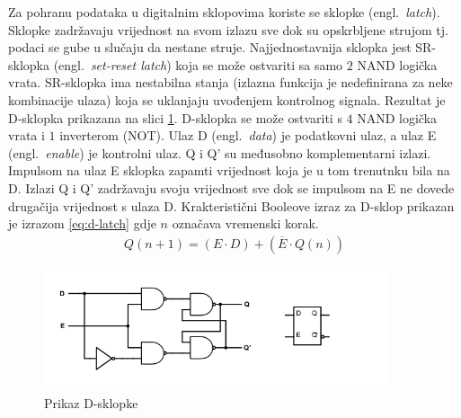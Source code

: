 \documentclass[times, utf8, diplomski]{fer}
\begin{document}
Za pohranu podataka u digitalnim sklopovima koriste se sklopke (engl.~\textit{latch}). Sklopke zadržavaju vrijednost na svom izlazu sve dok su opskrbljene strujom tj. podaci se gube u slučaju da nestane struje. Najjednostavnija sklopka jest SR-sklopka (engl.~\textit{set-reset latch}) koja se može ostvariti sa samo $2$ NAND logička vrata. SR-sklopka ima nestabilna stanja (izlazna funkcija je nedefinirana za neke kombinacije ulaza) koja se uklanjaju uvođenjem kontrolnog signala. Rezultat je D-sklopka prikazana na slici \ref{fig:D-latch}. D-sklopka se može ostvariti s $4$ NAND logička vrata i $1$ inverterom (NOT). Ulaz D (engl.~\textit{data}) je podatkovni ulaz, a ulaz E (engl.~\textit{enable}) je kontrolni ulaz. Q i Q' su međusobno komplementarni izlazi. Impulsom na ulaz E sklopka zapamti vrijednost koja je u tom trenutnku bila na D. Izlazi Q i Q' zadržavaju svoju vrijednost sve dok se impulsom na E ne dovede drugačija vrijednost s ulaza D. Krakteristični Booleove izraz za D-sklop prikazan je izrazom \ref{eq:d-latch} gdje $n$ označava vremenski korak.
%
\begin{gather}
	\label{eq:d-latch}
	Q(n+1)=(E \cdot D) + (\overline{E} \cdot Q(n))
\end{gather}

\begin{figure}[htb]
	\centering
	\includegraphics[width=0.9\textwidth]{img/D-latch_full.png}
	\caption{Prikaz D-sklopke}
	\label{fig:D-latch}
\end{figure}

\end{document}
